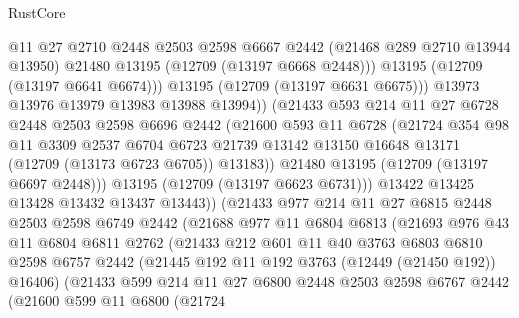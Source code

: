 \begin{lexlean}{RustCore}
\begin{coremodule}
                      @11
                      @27
                      @2710
                      @2448
                      @2503
                      @2598
                      @6667
                      @2442
                      (@21468 @289 @2710 @13944 @13950)
                      @21480
                      @13195
                      (@12709 (@13197 @6668 @2448)))
                    @13195
                    (@12709 (@13197 @6641 @6674)))
                  @13195
                  (@12709 (@13197 @6631 @6675)))
                @13973
                @13976
                @13979
                @13983
                @13988
                @13994))
            (@21433
              @593
              @214
              @11
              @27
              @6728
              @2448
              @2503
              @2598
              @6696
              @2442
              (@21600
                @593
                @11
                @6728
                (@21724
                  @354
                  @98
                  @11
                  @3309
                  @2537
                  @6704
                  @6723
                  @21739
                  @13142
                  @13150
                  @16648
                  @13171
                  (@12709 (@13173 @6723 @6705))
                  @13183))
              @21480
              @13195
              (@12709 (@13197 @6697 @2448)))
            @13195
            (@12709 (@13197 @6623 @6731)))
          @13422
          @13425
          @13428
          @13432
          @13437
          @13443))
      (@21433
        @977
        @214
        @11
        @27
        @6815
        @2448
        @2503
        @2598
        @6749
        @2442
        (@21688
          @977
          @11
          @6804
          @6813
          (@21693
            @976
            @43
            @11
            @6804
            @6811
            @2762
            (@21433
              @212
              @601
              @11
              @40
              @3763
              @6803
              @6810
              @2598
              @6757
              @2442
              (@21445 @192 @11 @192 @3763 (@12449 (@21450 @192)) @16406)
              (@21433
                @599
                @214
                @11
                @27
                @6800
                @2448
                @2503
                @2598
                @6767
                @2442
                (@21600
                  @599
                  @11
                  @6800
                  (@21724

\end{coremodule}
\end{lexlean}
